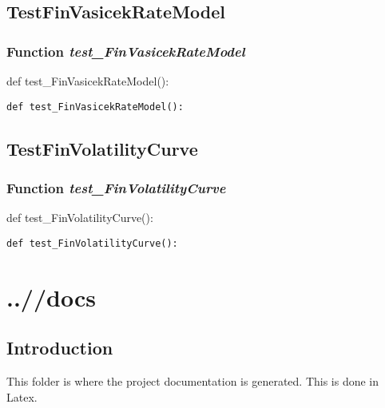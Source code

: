 \documentclass[twoside,11pt]{book}
\begin{document}
\newpage
\section{TestFinVasicekRateModel}

\subsection{Function {\it test\_FinVasicekRateModel}}
def test\_FinVasicekRateModel():

\begin{lstlisting}
def test_FinVasicekRateModel():
\end{lstlisting}


\newpage
\section{TestFinVolatilityCurve}

\subsection{Function {\it test\_FinVolatilityCurve}}
def test\_FinVolatilityCurve():

\begin{lstlisting}
def test_FinVolatilityCurve():
\end{lstlisting}


\chapter{..//docs}
\section{Introduction}
This folder is where the project documentation is generated. This is done in Latex.
\end{document}
